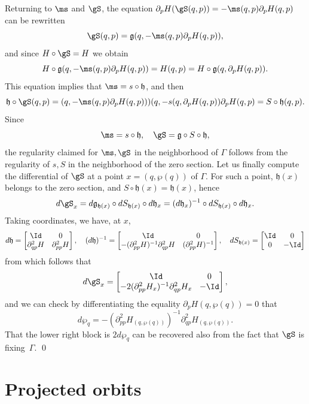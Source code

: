 Returning to $\ms$ and $\gS$, the equation
$
\partial_pH(\gS(q,p))= -\ms(q,p)\partial_pH(q,p)
$
can be rewritten
\[
\gS(q,p)=\mathfrak{g} (q,-\ms(q,p) \partial_p H(q,p)),
\]
and since $H\circ \gS=H$ we obtain
\[
H\circ \mathfrak{g} (q, -\ms(q,p) \partial_p H(q,p))
=H(q,p)=H\circ \mathfrak{g} (q, \partial_pH(q,p)).
\]
This equation implies that $\ms=s\circ \mathfrak{h}$, and then
\[
\mathfrak{h}\circ \gS(q,p)= (q, -\ms(q,p)\partial_pH(q,p)))
(q, -s(q,\partial_pH(q,p))\partial_pH(q,p)= S\circ \mathfrak{h}(q,p).
\]
Since
\[
\ms=s \circ \mathfrak{h},\quad \gS=\mathfrak{g}\circ S\circ \mathfrak{h},
\]
the regularity claimed for $\ms,\gS$ in the neighborhood of $\Gamma$ follows from the regularity of $s,S$ in the neighborhood of the zero section.
Let us finally compute the differential of $\gS$ at a point $x=(q, \wp(q))$ of $\Gamma$. For such a point, $\mathfrak{h}(x)$
belongs to the zero section, and
$S\circ \mathfrak{h}(x)=\mathfrak{h}(x)$, hence
\[
d\gS_x
=d\mathfrak{g}_{\mathfrak{h}(x)}\circ dS_{\mathfrak{h}(x)}\circ d\mathfrak{h}_x
=(d\mathfrak{h}_x )^{-1}\circ dS_{\mathfrak{h}(x)}\circ d\mathfrak{h}_x.
\]
Taking coordinates, we have, at $x$,
\[
d\mathfrak{h}=
\begin{bmatrix}
\Id&0\\ \partial^2_{qp}H &\partial^2_{pp}H
\end{bmatrix}, \quad
(d\mathfrak{h})^{-1}=
\begin{bmatrix}
\Id&0\\ -(\partial^2_{pp}H)^{-1} \partial^2_{qp}H &(\partial^2_{pp}H)^{-1}
\end{bmatrix}, \quad
dS_{\mathfrak{h}(x)}=
\begin{bmatrix}
\Id&0\\0&-\Id
\end{bmatrix}
\]
from which follows that
\[\arraycolsep4.5pt
d\gS_x=\begin{bmatrix}
\Id&0\\ -2(\partial^2_{pp}H_x)^{-1} \partial^2_{qp}H_x &-\Id
\end{bmatrix},
\]
and we can check by differentiating the equality
$
\partial_pH(q, \wp (q))=0
$
that
\[
d\wp_q=-
(\partial^2_{pp}H_{(q, \wp(q))})^{-1}
\partial^2_{qp}H_{(q, \wp(q))}.
\]
That the lower right block is $2d\wp_q$ can be recovered also from the fact that $\gS$ is fixing~$\Gamma$.
\qed

\section{Projected orbits}\label{sec-proj}

